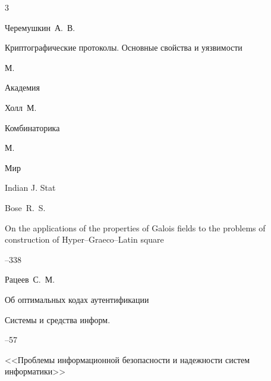 \begin{thebibliography}{3}




\by Черемушкин~А.~В.

\book Криптографические протоколы. Основные свойства и уязвимости

\publaddr М.

\publ Академия







\by Холл~М.

\book Комбинаторика

\publaddr М.

\publ Мир






\jour  Indian J. Stat

\by    Bose~R.~S.

\paper On the applications of the properties of Galois fields to the problems of construction of Hyper--Graeco--Latin square




--338




\by Рацеев~С.~М.

\paper Об оптимальных кодах аутентификации

\jour Системы и средства информ.




--57

\issueinfo <<Проблемы информационной безопасности и надежности систем информатики>>






\end{thebibliography}
